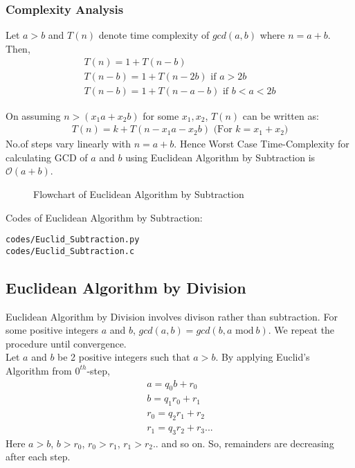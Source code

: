 \documentclass[journal,12pt,twocolumn]{IEEEtran}
\begin{document}
\subsubsection{Complexity Analysis}
Let $a > b$ and $T(n)$ denote time complexity of $gcd(a,b)$ where $n = a+b$. Then,
\begin{align}
T(n) = 1 + T(n-b)\\
T(n-b) = 1 + T(n-2b) \text{ if $a > 2b$}\\
T(n-b) = 1 + T(n-a-b) \text{ if $b < a < 2b$}
\end{align}

On assuming $n > (x_{1}a + x_{2}b)$ for some $x_{1}, x_{2}$, $T(n)$ can be written as:
\begin{align}
T(n) = k + T(n - x_{1}a - x_{2}b) \text{ (For $k = x_{1} + x_{2}$)}
\end{align}
No.of steps vary linearly with $n=a+b$. Hence Worst Case Time-Complexity for calculating GCD of $a$ and  $b$ using Euclidean Algorithm by Subtraction is $\mathcal{O}(a + b)$.\\

\begin{figure}[h!]
	\begin{center}
		\resizebox{\columnwidth/1}{!}{}
	\end{center}
	\caption{Flowchart of Euclidean Algorithm by Subtraction}
	\label{fig:Input}
\end{figure}

Codes of Euclidean Algorithm by Subtraction:
\begin{lstlisting}
codes/Euclid_Subtraction.py
codes/Euclid_Subtraction.c
\end{lstlisting}

\subsection{Euclidean Algorithm by Division}
Euclidean Algorithm by Division involves divison rather than subtraction. For some positive integers $a$ and $b$, $gcd(a, b) = gcd(b, a \textrm{ mod}\ b)$. We repeat the procedure until convergence.\\

Let $a$ and $b$ be 2 positive integers such that $a > b$. By applying Euclid's Algorithm from $0^{th}$-step,\\
\begin{align}
	a = q_{0}b + r_{0}\\
	b = q_{1}r_{0} + r_{1}\\
	r_{0} = q_{2}r_{1} + r_{2}\\
	r_{1} = q_{3}r_{2} + r_{3}...
\end{align}
Here $a > b$, $ b > r_{0}$, $r_{0} > r_{1}$, $r_{1} > r_{2}$.. and so on. So, remainders are decreasing after each step.
\end{document}
